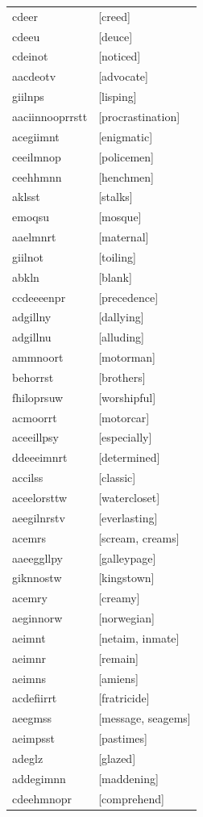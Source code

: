 \documentclass{article}
\begin{document}
\begin{tabular}{ll}
cdeer & [creed] \\
cdeeu & [deuce] \\
cdeinot & [noticed] \\
aacdeotv & [advocate] \\
giilnps & [lisping] \\
aaciinnooprrstt & [procrastination] \\
acegiimnt & [enigmatic] \\
ceeilmnop & [policemen] \\
ceehhmnn & [henchmen] \\
aklsst & [stalks] \\
emoqsu & [mosque] \\
aaelmnrt & [maternal] \\
giilnot & [toiling] \\
abkln & [blank] \\
ccdeeeenpr & [precedence] \\
adgillny & [dallying] \\
adgillnu & [alluding] \\
ammnoort & [motorman] \\
behorrst & [brothers] \\
fhiloprsuw & [worshipful] \\
acmoorrt & [motorcar] \\
aceeillpsy & [especially] \\
ddeeeimnrt & [determined] \\
accilss & [classic] \\
aceelorsttw & [watercloset] \\
aeegilnrstv & [everlasting] \\
acemrs & [scream, creams] \\
aaeeggllpy & [galleypage] \\
giknnostw & [kingstown] \\
acemry & [creamy] \\
aeginnorw & [norwegian] \\
aeimnt & [netaim, inmate] \\
aeimnr & [remain] \\
aeimns & [amiens] \\
acdefiirrt & [fratricide] \\
aeegmss & [message, seagems] \\
aeimpsst & [pastimes] \\
adeglz & [glazed] \\
addegimnn & [maddening] \\
cdeehmnopr & [comprehend] \\

\end{tabular}
\end{document}
